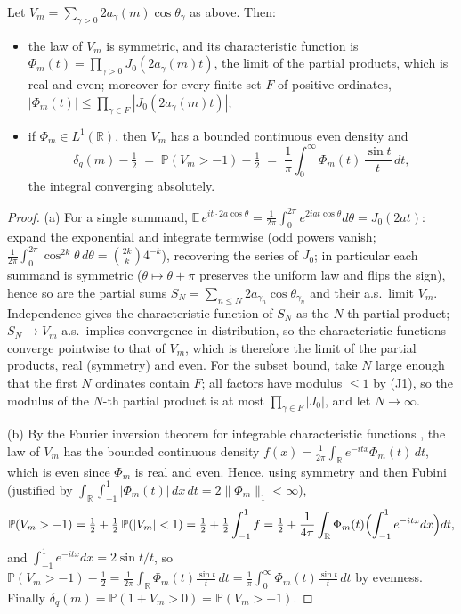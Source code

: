 \begin{lemma}\label{lem:invert}
Let $V_m=\sum_{\gamma>0}2a_\gamma(m)\cos\theta_\gamma$ as above. Then:
\begin{itemize}
\item[(a)] the law of $V_m$ is symmetric, and its characteristic
function is
$\Phi_m(t)=\prod_{\gamma>0}J_0(2a_\gamma(m)t)$, the limit of the
partial products, which is real and even; moreover for every finite
set $F$ of positive ordinates,
$|\Phi_m(t)|\le\prod_{\gamma\in F}|J_0(2a_\gamma(m)t)|$;
\item[(b)] if $\Phi_m\in L^1(\mathbb R)$, then $V_m$ has a bounded
continuous even density and
\[
\delta_q(m)-\tfrac12\;=\;\mathbb P(V_m>-1)-\tfrac12
\;=\;\frac1\pi\int_0^\infty\Phi_m(t)\,\frac{\sin t}{t}\,dt ,
\]
the integral converging absolutely.
\end{itemize}
\end{lemma}

\begin{proof}
(a) For a single summand, $\mathbb E\,e^{it\cdot2a\cos\theta}
=\frac1{2\pi}\int_0^{2\pi}e^{2iat\cos\theta}d\theta=J_0(2at)$: expand
the exponential and integrate termwise (odd powers vanish;
$\frac1{2\pi}\int_0^{2\pi}\cos^{2k}\theta\,d\theta
=\binom{2k}{k}4^{-k}$), recovering the series of $J_0$; in particular
each summand is symmetric ($\theta\mapsto\theta+\pi$ preserves the
uniform law and flips the sign), hence so are the partial sums
$S_N=\sum_{n\le N}2a_{\gamma_n}\cos\theta_{\gamma_n}$ and their a.s.\
limit $V_m$. Independence gives the characteristic function of $S_N$
as the $N$-th partial product; $S_N\to V_m$ a.s.\ implies convergence
in distribution, so the characteristic functions converge pointwise
to that of $V_m$, which is therefore the limit of the partial
products, real (symmetry) and even. For the subset bound, take
$N$ large enough that the first $N$ ordinates contain $F$; all
factors have modulus $\le1$ by (J1), so the modulus of the $N$-th
partial product is at most $\prod_{\gamma\in F}|J_0|$, and let
$N\to\infty$.

(b) By the Fourier inversion theorem for integrable characteristic
functions \cite[Ch.~XV.3]{Fel71}, the law of $V_m$ has the bounded
continuous density $f(x)=\frac1{2\pi}\int_{\mathbb R}
e^{-itx}\Phi_m(t)\,dt$, which is even since $\Phi_m$ is real and
even. Hence, using symmetry and then Fubini (justified by
$\int_{\mathbb R}\int_{-1}^1|\Phi_m(t)|\,dx\,dt
=2\|\Phi_m\|_1<\infty$),
\[
\mathbb P(V_m>-1)=\tfrac12+\tfrac12\,\mathbb P(|V_m|<1)
=\tfrac12+\tfrac12\int_{-1}^1 f
=\tfrac12+\frac1{4\pi}\int_{\mathbb R}\Phi_m(t)\Bigl(\int_{-1}^1
e^{-itx}dx\Bigr)dt ,
\]
and $\int_{-1}^1e^{-itx}dx=2\sin t/t$, so
$\mathbb P(V_m>-1)-\tfrac12=\frac1{2\pi}\int_{\mathbb R}\Phi_m(t)
\frac{\sin t}t\,dt=\frac1\pi\int_0^\infty\Phi_m(t)\frac{\sin t}t\,dt$
by evenness. Finally $\delta_q(m)=\mathbb P(1+V_m>0)
=\mathbb P(V_m>-1)$.
\end{proof}

